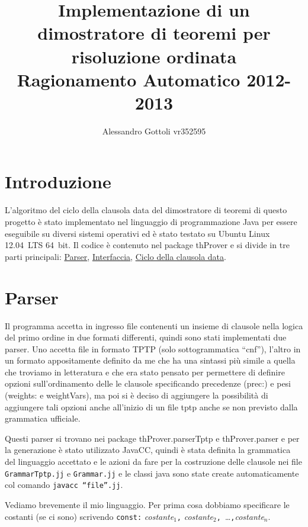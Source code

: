 \documentclass[a4paper,11pt]{article} %
\newcommand{\sintassi}{\texttt}
\newcommand{\file}{\texttt}
\newcommand{\package}{\textsf}
\newcommand{\com}{\texttt}
\begin{document}
\title{Implementazione di un dimostratore di teoremi per risoluzione ordinata \\
       Ragionamento Automatico 2012-2013}
\author{Alessandro Gottoli vr352595}
\maketitle

\section*{Introduzione}
L'algoritmo del ciclo della clausola data del dimostratore di teoremi
di questo progetto è stato implementato nel linguaggio di 
programmazione Java per essere eseguibile su diversi sistemi
operativi ed è stato testato su Ubuntu Linux 12.04~LTS 64~bit.
Il codice è contenuto nel package \package{thProver} e si divide in tre parti
principali: \hyperref[sec: parser]{Parser}, \hyperref[sec: interfaccia]{Interfaccia},
\hyperref[sec: ciclo]{Ciclo della clausola data}.

\section{Parser}\label{sec: parser}
Il programma accetta in ingresso file contenenti un insieme di clausole nella logica
del primo ordine in due formati differenti, quindi sono
stati implementati due parser. %
Uno accetta file in formato TPTP (solo sottogrammatica ``cnf''), l'altro
in un formato appositamente definito da me che ha una sintassi più simile a 
quella che troviamo in letteratura e che era stato pensato per permettere 
di definire opzioni
sull'ordinamento delle le clausole specificando precedenze (prec:) 
e pesi (weights: e weightVars), ma poi si è
deciso di aggiungere la possibilità di aggiungere tali opzioni anche all'inizio
di un file tptp anche se non previsto dalla grammatica ufficiale.
 
Questi parser si trovano nei package \package{thProver.parserTptp} e 
\package{thProver.parser} e per la generazione è stato utilizzato JavaCC, 
quindi è stata definita
la grammatica del linguaggio accettato e le azioni da fare per la costruzione
delle clausole nei file \file{GrammarTptp.jj} e \file{Grammar.jj} e le classi
java sono state create automaticamente col comando \com{javacc ``file''.jj}.

Vediamo brevemente il mio linguaggio. 
Per prima cosa dobbiamo specificare le costanti (se ci sono) scrivendo
\sintassi{const:} \emph{costante$_{1}$}\sintassi{,}
\emph{costante$_{2}$}\sintassi{,}~\ldots\sintassi{,}\emph{costante$_{n}$}.
\end{document}
